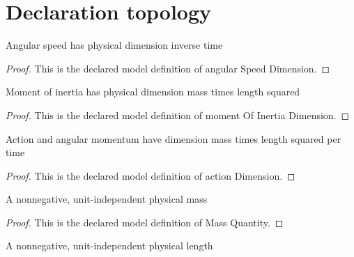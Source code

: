 \section{Declaration topology}
\begin{definition}
  \label{def:physics:phyx-mini-0582:phyxminiproblems-problemphyxmini0582-angularspeeddimension}
  Angular speed has physical dimension inverse time
\end{definition}
\begin{proof}
  This is the declared model definition of angular Speed Dimension.
\end{proof}
\begin{definition}
  \label{def:physics:phyx-mini-0582:phyxminiproblems-problemphyxmini0582-momentofinertiadimension}
  Moment of inertia has physical dimension mass times length squared
\end{definition}
\begin{proof}
  This is the declared model definition of moment Of Inertia Dimension.
\end{proof}
\begin{definition}
  \label{def:physics:phyx-mini-0582:phyxminiproblems-problemphyxmini0582-actiondimension}
  Action and angular momentum have dimension mass times length squared per time
\end{definition}
\begin{proof}
  This is the declared model definition of action Dimension.
\end{proof}
\begin{definition}
  \label{def:physics:phyx-mini-0582:phyxminiproblems-problemphyxmini0582-massquantity}
  A nonnegative, unit-independent physical mass
\end{definition}
\begin{proof}
  This is the declared model definition of Mass Quantity.
\end{proof}
\begin{definition}
  \label{def:physics:phyx-mini-0582:phyxminiproblems-problemphyxmini0582-lengthquantity}
  A nonnegative, unit-independent physical length
\end{definition}

